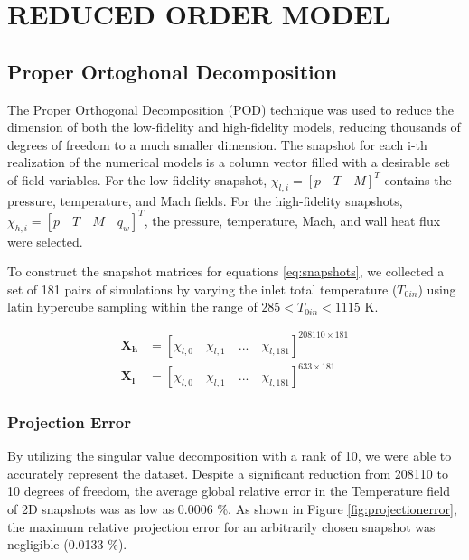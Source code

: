 \documentclass[10pt,fleqn,a4paper,twoside]{article}
\begin{document}
\section{REDUCED ORDER MODEL}

\subsection{Proper Ortoghonal Decomposition}

The Proper Orthogonal Decomposition (POD)\cite{Brunton2019} technique was used to reduce the dimension of both the low-fidelity and high-fidelity models, reducing thousands of degrees of freedom to a much smaller dimension. The snapshot for each i-th realization of the numerical models is a column vector filled with a desirable set of field variables. For the low-fidelity snapshot, $\chi_{l,i} = \left[ p \quad T \quad M\right]^T$ contains the pressure, temperature, and Mach fields. For the high-fidelity snapshots, $\chi_{h,i} = \left[ p \quad T \quad M \quad q_w\right]^T$, the pressure, temperature, Mach, and wall heat flux were selected.

To construct the snapshot matrices for equations \eqref{eq:snapshots}, we collected a set of 181 pairs of simulations by varying the inlet total temperature ($T_{0in}$) using latin hypercube sampling within the range of $285 < T_{0in} < 1115$ K.

\begin{align}
\mathbf{X_h} &= \left[ \chi_{l,0} \quad \chi_{l,1} \quad ... \quad \chi_{l,181}\right]^{208110 \times 181} \nonumber \\
\mathbf{X_l} &= \left[ \chi_{l,0} \quad \chi_{l,1} \quad ... \quad \chi_{l,181}\right]^{633 \times 181}
\label{eq:snapshots}
\end{align}

\subsubsection{Projection Error}

By utilizing the singular value decomposition with a rank of 10, we were able to accurately represent the dataset. Despite a significant reduction from 208110 to 10 degrees of freedom, the average global relative error in the Temperature field of 2D snapshots was as low as $0.0006$ \%. As shown in Figure \eqref{fig:projectionerror}, the maximum relative projection error for an arbitrarily chosen snapshot was negligible (0.0133 \%).
\end{document}
